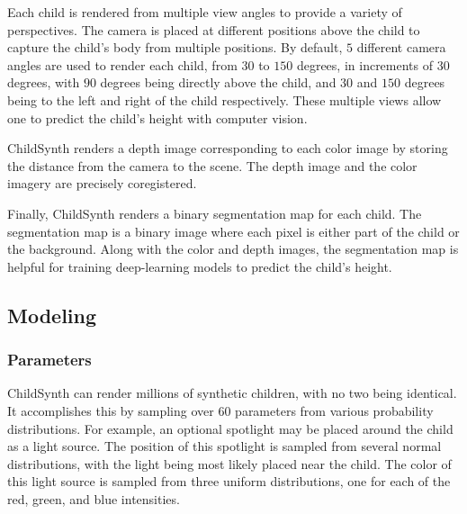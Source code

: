 \documentclass{article}
\begin{document}
Each child is rendered from multiple view angles to provide a variety of perspectives. The camera is placed at different positions above the child to capture the child's body from multiple positions. By default, $5$ different camera angles are used to render each child, from $30$ to $150$ degrees, in increments of $30$ degrees, with $90$ degrees being directly above the child, and $30$ and $150$ degrees being to the left and right of the child respectively. These multiple views allow one to predict the child's height with computer vision.

ChildSynth renders a depth image corresponding to each color image by storing the distance from the camera to the scene. The depth image and the color imagery are precisely coregistered.

Finally, ChildSynth renders a binary segmentation map for each child. The segmentation map is a binary image where each pixel is either part of the child or the background. Along with the color and depth images, the segmentation map is helpful for training deep-learning models to predict the child's height.


\subsection{Modeling}

\subsubsection{Parameters}

ChildSynth can render millions of synthetic children, with no two being identical.  It accomplishes this by sampling over $60$ parameters from various probability distributions. For example, an optional spotlight may be placed around the child as a light source. The position of this spotlight is sampled from several normal distributions, with the light being most likely placed near the child. The color of this light source is sampled from three uniform distributions, one for each of the red, green, and blue intensities. 





\end{document}
